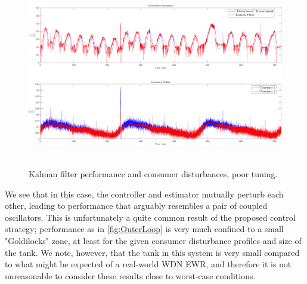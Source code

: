 \begin{figure}[h!]
	\includegraphics[height=8cm,width=\linewidth]{Pictures/DisturbanceEstimationBad.pdf}
	\caption{Kalman filter performance and consumer disturbances, poor tuning.}
	\label{fig:DisturbanceEstimationBad}
\end{figure}

We see that in this case, the controller and estimator mutually perturb each other, leading to performance that arguably resembles a pair of coupled oscillators. This is unfortunately a quite common result of the proposed control strategy; performance as in \cref{fig:OuterLoop} is very much confined to a small "Goldilocks" zone, at least for the given consumer disturbance profiles and size of the tank. We note, however, that the tank in this system is very small compared to what might be expected of a real-world WDN EWR, and therefore it is not unreasonable to consider these results close to worst-case conditions.